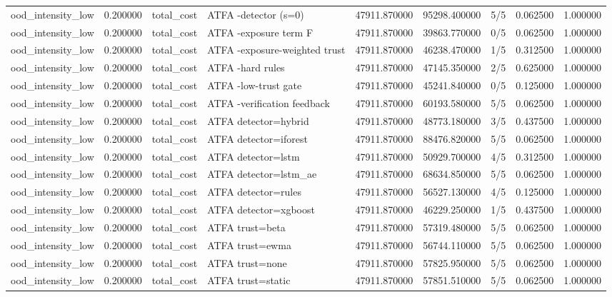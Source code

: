 \begin{tabular}{lrllrrlrr}
ood\_intensity\_low & 0.200000 & total\_cost & ATFA -detector (s=0) & 47911.870000 & 95298.400000 & 5/5 & 0.062500 & 1.000000 \\
ood\_intensity\_low & 0.200000 & total\_cost & ATFA -exposure term F & 47911.870000 & 39863.770000 & 0/5 & 0.062500 & 1.000000 \\
ood\_intensity\_low & 0.200000 & total\_cost & ATFA -exposure-weighted trust & 47911.870000 & 46238.470000 & 1/5 & 0.312500 & 1.000000 \\
ood\_intensity\_low & 0.200000 & total\_cost & ATFA -hard rules & 47911.870000 & 47145.350000 & 2/5 & 0.625000 & 1.000000 \\
ood\_intensity\_low & 0.200000 & total\_cost & ATFA -low-trust gate & 47911.870000 & 45241.840000 & 0/5 & 0.125000 & 1.000000 \\
ood\_intensity\_low & 0.200000 & total\_cost & ATFA -verification feedback & 47911.870000 & 60193.580000 & 5/5 & 0.062500 & 1.000000 \\
ood\_intensity\_low & 0.200000 & total\_cost & ATFA detector=hybrid & 47911.870000 & 48773.180000 & 3/5 & 0.437500 & 1.000000 \\
ood\_intensity\_low & 0.200000 & total\_cost & ATFA detector=iforest & 47911.870000 & 88476.820000 & 5/5 & 0.062500 & 1.000000 \\
ood\_intensity\_low & 0.200000 & total\_cost & ATFA detector=lstm & 47911.870000 & 50929.700000 & 4/5 & 0.312500 & 1.000000 \\
ood\_intensity\_low & 0.200000 & total\_cost & ATFA detector=lstm\_ae & 47911.870000 & 68634.850000 & 5/5 & 0.062500 & 1.000000 \\
ood\_intensity\_low & 0.200000 & total\_cost & ATFA detector=rules & 47911.870000 & 56527.130000 & 4/5 & 0.125000 & 1.000000 \\
ood\_intensity\_low & 0.200000 & total\_cost & ATFA detector=xgboost & 47911.870000 & 46229.250000 & 1/5 & 0.437500 & 1.000000 \\
ood\_intensity\_low & 0.200000 & total\_cost & ATFA trust=beta & 47911.870000 & 57319.480000 & 5/5 & 0.062500 & 1.000000 \\
ood\_intensity\_low & 0.200000 & total\_cost & ATFA trust=ewma & 47911.870000 & 56744.110000 & 5/5 & 0.062500 & 1.000000 \\
ood\_intensity\_low & 0.200000 & total\_cost & ATFA trust=none & 47911.870000 & 57825.950000 & 5/5 & 0.062500 & 1.000000 \\
ood\_intensity\_low & 0.200000 & total\_cost & ATFA trust=static & 47911.870000 & 57851.510000 & 5/5 & 0.062500 & 1.000000 \\

\end{tabular}
